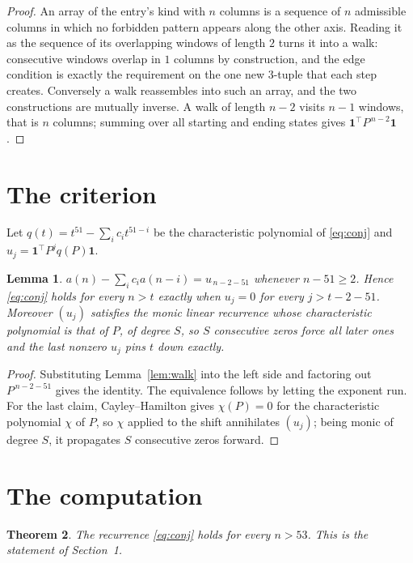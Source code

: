 \documentclass[11pt,a4paper]{article}
\theoremstyle{plain}
\newtheorem{theorem}{Theorem}
\newtheorem{lemma}[theorem]{Lemma}
\theoremstyle{definition}
\begin{document}
\begin{proof}
An array of the entry's kind with $n$ columns is a sequence of $n$ admissible columns in
which no forbidden pattern appears along the other axis. Reading it as the sequence of its
overlapping windows of length $2$ turns it into a walk: consecutive windows overlap in
$1$ columns by construction, and the edge condition is exactly the requirement on the one
new $3$-tuple that each step creates. Conversely a walk reassembles into such an array,
and the two constructions are mutually inverse. A walk of length $n-2$ visits $n-1$
windows, that is $n$ columns; summing over all starting and ending states gives
$\mathbf{1}^{\!\top}P^{\,n-2}\mathbf{1}$.
\end{proof}

\section{The criterion}

Let $q(t)=t^{51}-\sum_i c_i t^{51-i}$ be the characteristic polynomial of
\eqref{eq:conj} and $u_j=\mathbf{1}^{\!\top}P^{j}q(P)\mathbf{1}$.

\begin{lemma}\label{lem:crit}
$a(n)-\sum_i c_i a(n-i)=u_{\,n-2-51}$ whenever $n-51\ge2$. Hence
\eqref{eq:conj} holds for every $n>t$ exactly when $u_j=0$ for every
$j>t-2-51$. Moreover $(u_j)$ satisfies the monic linear recurrence whose
characteristic polynomial is that of $P$, of degree $S$, so $S$ consecutive zeros force all
later ones and the last nonzero $u_j$ pins $t$ down exactly.
\end{lemma}

\begin{proof}
Substituting Lemma~\ref{lem:walk} into the left side and factoring out
$P^{\,n-2-51}$ gives the identity. The equivalence follows by letting the exponent
run. For the last claim, Cayley--Hamilton gives $\chi(P)=0$ for the characteristic
polynomial $\chi$ of $P$, so $\chi$ applied to the shift annihilates $(u_j)$; being monic of
degree $S$, it propagates $S$ consecutive zeros forward.
\end{proof}

\section{The computation}

\begin{theorem}
The recurrence \eqref{eq:conj} holds for every $n>53$. This is the statement of
Section~1.
\end{theorem}
\end{document}
